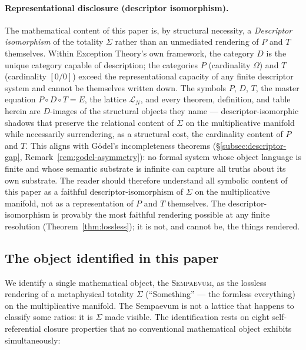 \documentclass[11pt,a4paper]{article}
\theoremstyle{definition}
\theoremstyle{remark}
\newcommand{\Sempaevum}{\textsc{Sempaevum}}
\newcommand{\PDT}{\ensuremath{P{\circ}D{\circ}T}}
\begin{document}
\paragraph{Representational disclosure (descriptor isomorphism).} The mathematical content of this paper is, by structural necessity, a \emph{Descriptor isomorphism} of the totality $\Sigma$ rather than an unmediated rendering of $P$ and $T$ themselves. Within Exception Theory's own framework, the category $D$ is the unique category capable of description; the categories $P$ (cardinality $\Omega$) and $T$ (cardinality $[0/0]$) exceed the representational capacity of any finite descriptor system and cannot be themselves written down. The symbols $P$, $D$, $T$, the master equation $\PDT = E$, the lattice $\mathcal{L}_{N}$, and every theorem, definition, and table herein are $D$-images of the structural objects they name --- descriptor-isomorphic shadows that preserve the relational content of $\Sigma$ on the multiplicative manifold while necessarily surrendering, as a structural cost, the cardinality content of $P$ and $T$. This aligns with Gödel's incompleteness theorems (\S\ref{subsec:descriptor-gap}, Remark~\ref{rem:godel-asymmetry}): no formal system whose object language is finite and whose semantic substrate is infinite can capture all truths about its own substrate. The reader should therefore understand all symbolic content of this paper as a faithful descriptor-isomorphism of $\Sigma$ on the multiplicative manifold, not as a representation of $P$ and $T$ themselves. The descriptor-isomorphism is provably the most faithful rendering possible at any finite resolution (Theorem~\ref{thm:lossless}); it is not, and cannot be, the things rendered.

\subsection{The object identified in this paper}

We identify a single mathematical object, the \Sempaevum, as the lossless rendering of a metaphysical totality $\Sigma$ (``Something'' --- the formless everything) on the multiplicative manifold. The Sempaevum is not a lattice that happens to classify some ratios: it is $\Sigma$ made visible. The identification rests on eight self-referential closure properties that no conventional mathematical object exhibits simultaneously:
\end{document}
